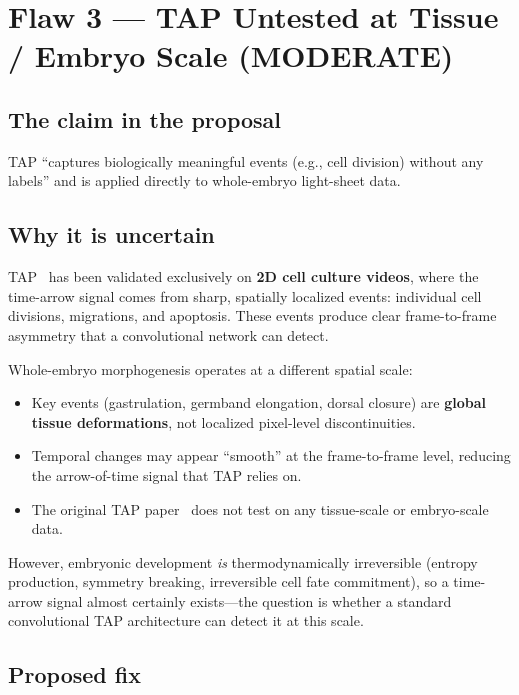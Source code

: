 \documentclass{article}
\begin{document}
\section{Flaw 3 --- TAP Untested at Tissue / Embryo Scale (MODERATE)}

\subsection*{The claim in the proposal}
TAP ``captures biologically meaningful events (e.g., cell division) without any
labels'' and is applied directly to whole-embryo light-sheet data.

\subsection*{Why it is uncertain}
TAP~\cite{tap} has been validated exclusively on \textbf{2D cell culture
	videos}, where the time-arrow signal comes from sharp, spatially localized
events: individual cell divisions, migrations, and apoptosis. These events
produce clear frame-to-frame asymmetry that a convolutional network can detect.

Whole-embryo morphogenesis operates at a different spatial scale:

\begin{itemize}
	\item Key events (gastrulation, germband elongation, dorsal closure) are
	      \textbf{global tissue deformations}, not localized pixel-level
	      discontinuities.
	\item Temporal changes may appear ``smooth'' at the frame-to-frame level,
	      reducing the arrow-of-time signal that TAP relies on.
	\item The original TAP paper~\cite{tap} does not test on any tissue-scale or
	      embryo-scale data.
\end{itemize}

\noindent However, embryonic development \emph{is} thermodynamically
irreversible (entropy production, symmetry breaking, irreversible cell fate
commitment), so a time-arrow signal almost certainly exists---the question is
whether a standard convolutional TAP architecture can detect it at this scale.

\subsection*{Proposed fix}
\end{document}
